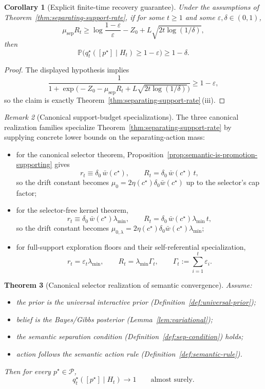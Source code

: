 \documentclass[11pt]{article}
\newtheorem{theorem}{Theorem}[section]
\newtheorem{corollary}[theorem]{Corollary}
\theoremstyle{definition}
\theoremstyle{remark}
\newtheorem{remark}[theorem]{Remark}
\newcommand{\Pcal}{\mathcal{P}}
\newcommand{\Prob}{\mathbb{P}}
\begin{document}
\begin{corollary}[Explicit finite-time recovery guarantee]
\label{cor:separating-support-finite-time}
Under the assumptions of Theorem~\ref{thm:separating-support-rate}, if for some $t\ge 1$ and some $\varepsilon,\delta\in(0,1)$,
\[
\mu_{\mathrm{sep}}R_t
\ge
\log\frac{1-\varepsilon}{\varepsilon}-Z_0+L\sqrt{2t\log(1/\delta)},
\]
then
\[
\Prob\!\bigl(q_t^\star([p^\star]\mid H_t)\ge 1-\varepsilon\bigr)\ge 1-\delta.
\]
\end{corollary}

\begin{proof}
The displayed hypothesis implies
\[
\frac{1}{1+\exp\!\bigl(-Z_0-\mu_{\mathrm{sep}}R_t+L\sqrt{2t\log(1/\delta)}\bigr)}\ge 1-\varepsilon,
\]
so the claim is exactly Theorem~\ref{thm:separating-support-rate}\,\textup{(iii)}.
\end{proof}

\begin{remark}[Canonical support-budget specializations]
\label{rem:canonical-support-budgets}
The three canonical realization families specialize Theorem~\ref{thm:separating-support-rate} by supplying concrete lower bounds on the separating-action mass:
\begin{itemize}
\item[(i)] for the canonical selector theorem, Proposition~\ref{prop:semantic-is-promotion-supporting} gives
\[
r_t\equiv \delta_0\,\bar w(c^\star),
\qquad
R_t=\delta_0\,\bar w(c^\star)\,t,
\]
so the drift constant becomes $\mu_0=2\eta(c^\star)\delta_0\bar w(c^\star)$ up to the selector's cap factor;
\item[(ii)] for the selector-free kernel theorem,
\[
r_t\equiv \delta_0\,\bar w(c^\star)\lambda_{\min},
\qquad
R_t=\delta_0\,\bar w(c^\star)\lambda_{\min}\,t,
\]
so the drift constant becomes $\mu_{0,\lambda}=2\eta(c^\star)\delta_0\bar w(c^\star)\lambda_{\min}$;
\item[(iii)] for full-support exploration floors and their self-referential specialization,
\[
r_t=\varepsilon_t\lambda_{\min},
\qquad
R_t=\lambda_{\min}\Gamma_t,
\qquad
\Gamma_t:=\sum_{i=1}^t\varepsilon_i.
\]
\end{itemize}
\end{remark}

\begin{theorem}[Canonical selector realization of semantic convergence]
\label{thm:semantic-convergence}
Assume:
\begin{itemize}
\item[(C1)] the prior is the universal interactive prior (Definition~\ref{def:universal-prior});
\item[(C2)] belief is the Bayes/Gibbs posterior (Lemma~\ref{lem:variational});
\item[(C3)] the semantic separation condition (Definition~\ref{def:sep-condition}) holds;
\item[(C4)] action follows the semantic action rule (Definition~\ref{def:semantic-rule}).
\end{itemize}
Then for every $p^\star\in\Pcal$,
\[
q_t^\star([p^\star]\mid H_t)\longrightarrow 1
\qquad
\text{almost surely.}
\]
\end{theorem}
\end{document}
